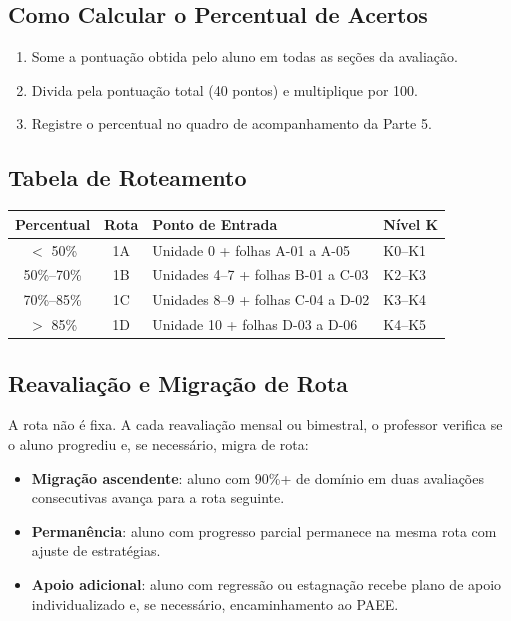 \subsection{Como Calcular o Percentual de Acertos}

\begin{enumerate}[leftmargin=2cm]
  \item Some a pontuação obtida pelo aluno em todas as seções da avaliação.
  \item Divida pela pontuação total (40 pontos) e multiplique por 100.
  \item Registre o percentual no quadro de acompanhamento da Parte 5.
\end{enumerate}

\subsection{Tabela de Roteamento}

\begin{center}
\begin{tabular}{|c|c|l|l|}
\hline
\textbf{Percentual} & \textbf{Rota} & \textbf{Ponto de Entrada} & \textbf{Nível K} \\
\hline
$<$ 50\% & 1A & Unidade 0 + folhas A-01 a A-05 & K0--K1 \\
\hline
50\%--70\% & 1B & Unidades 4--7 + folhas B-01 a C-03 & K2--K3 \\
\hline
70\%--85\% & 1C & Unidades 8--9 + folhas C-04 a D-02 & K3--K4 \\
\hline
$>$ 85\% & 1D & Unidade 10 + folhas D-03 a D-06 & K4--K5 \\
\hline
\end{tabular}
\end{center}

\subsection{Reavaliação e Migração de Rota}

A rota não é fixa. A cada reavaliação mensal ou bimestral, o professor verifica
se o aluno progrediu e, se necessário, migra de rota:

\begin{itemize}
  \item \textbf{Migração ascendente}: aluno com 90\%+ de domínio em duas
        avaliações consecutivas avança para a rota seguinte.
  \item \textbf{Permanência}: aluno com progresso parcial permanece na mesma
        rota com ajuste de estratégias.
  \item \textbf{Apoio adicional}: aluno com regressão ou estagnação recebe
        plano de apoio individualizado e, se necessário, encaminhamento
        ao PAEE.
\end{itemize}


